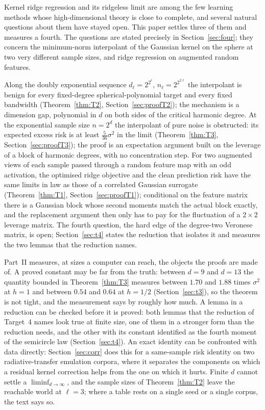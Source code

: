\documentclass[11pt]{article}
\theoremstyle{definition}
\newcommand{\numVhMaxHalf}{0.64}
\newcommand{\numVhMaxOne}{1.88}
\newcommand{\numVhMinHalf}{0.54}
\newcommand{\numVhMinOne}{1.70}
\begin{document}
Kernel ridge regression and its ridgeless limit are among the few learning methods whose
high-dimensional theory is close to complete, and several natural questions about them have stayed
open. This paper settles three of them and measures a fourth. The questions are stated precisely in
Section~\ref{sec:four}; they concern the minimum-norm interpolant of the Gaussian kernel on the
sphere at two very different sample sizes, and ridge regression on augmented random features.

Along the doubly exponential sequence $d_\ell=2^{2^\ell}$, $n_\ell=2^{2^{2\ell}}$ the interpolant is
benign for every fixed-degree spherical-polynomial target and every fixed bandwidth
(Theorem~\ref{thm:T2}, Section~\ref{sec:proofT2}); the mechanism is a dimension gap, polynomial in $d$
on both sides of the critical harmonic degree. At the exponential sample size $n=2^d$ the interpolant
of pure noise is obstructed: its expected excess risk is at least $\frac5{36}\sigma^2$ in the limit
(Theorem~\ref{thm:T3}, Section~\ref{sec:proofT3}); the proof is an expectation argument built on the
leverage of a block of harmonic degrees, with no concentration step. For two augmented views of each
sample passed through a random feature map with an odd activation, the optimised ridge objective and
the clean prediction risk have the same limits in law as those of a correlated Gaussian surrogate
(Theorem~\ref{thm:T1}, Section~\ref{sec:proofT1}); conditional on the feature matrix there is a Gaussian
block whose second moments match the actual block exactly, and the replacement argument then only
has to pay for the fluctuation of a $2\times2$ leverage matrix. The fourth question, the hard edge of
the degree-two Veronese matrix, is open; Section~\ref{sec:t4} states the reduction that isolates it
and measures the two lemmas that the reduction names.

Part~II measures, at sizes a computer can reach, the objects the proofs are made of. A proved constant
may be far from the truth: between $d=9$ and $d=13$ the quantity bounded in Theorem~\ref{thm:T3}
measures between $\numVhMinOne$ and $\numVhMaxOne$ times $\sigma^2$ at $h=1$ and between
$\numVhMinHalf$ and $\numVhMaxHalf$ at $h=1/2$ (Section~\ref{sec:t3}), so the theorem is not tight, and
the measurement says by roughly how much. A lemma in a reduction can be checked before it is proved:
both lemmas that the reduction of Target~4 names look true at finite size, one of them in a stronger
form than the reduction needs, and the other with its constant identified as the fourth moment of the
semicircle law (Section~\ref{sec:t4}). An exact identity can be confronted with data directly:
Section~\ref{sec:corr} does this for a same-sample risk identity on two radiative-transfer emulation
corpora, where it separates the components on which a residual kernel correction helps from the one
on which it hurts. Finite $d$ cannot settle a $\liminf_{d\to\infty}$, and the sample sizes of
Theorem~\ref{thm:T2} leave the reachable world at $\ell=3$; where a table rests on a single seed or a
single corpus, the text says so.
\end{document}
